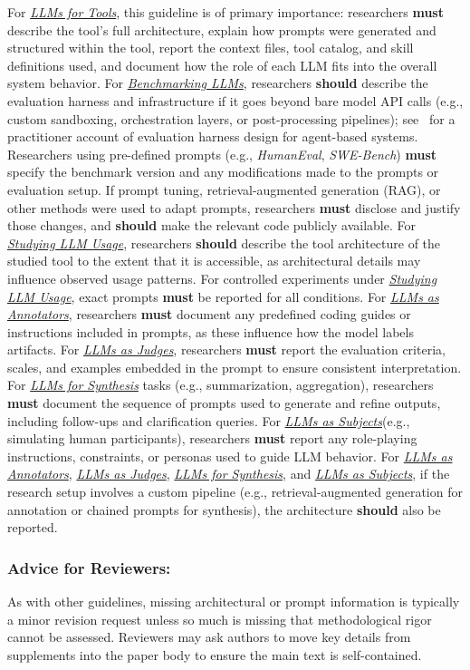 \documentclass[smallextended]{svjour3}
\newcommand{\must}{\textbf{must}\xspace}
\newcommand{\should}{\textbf{should}\xspace}
\newcommand{\annotators}{\hyperref[sec:llms-as-annotators]{\emph{LLMs as Annotators}}\xspace}
\newcommand{\judges}{\hyperref[sec:llms-as-judges]{\emph{LLMs as Judges}}\xspace}
\newcommand{\synthesis}{\hyperref[sec:llms-for-synthesis]{\emph{LLMs for Synthesis}}\xspace}
\newcommand{\subjects}{\hyperref[sec:llms-as-subjects]{\emph{LLMs as Subjects}}\xspace}
\newcommand{\llmusage}{\hyperref[sec:studying-llm-usage-in-software-engineering]{\emph{Studying LLM Usage}}\xspace}
\newcommand{\newtools}{\hyperref[sec:llms-for-new-software-engineering-tools]{\emph{LLMs for Tools}}\xspace}
\newcommand{\benchmarkingtasks}{\hyperref[sec:benchmarking-llms-for-software-engineering-tasks]{\emph{Benchmarking LLMs}}\xspace}
\newcommand{\annotators}{\href{/study-types\#llms-as-annotators}{\emph{LLMs as Annotators}}\xspace}
\newcommand{\judges}{\href{/study-types\#llms-as-judges}{\emph{LLMs as Judges}}\xspace}
\newcommand{\synthesis}{\href{/study-types\#llms-for-synthesis}{\emph{LLMs for Synthesis}}\xspace}
\newcommand{\subjects}{\href{/study-types\#llms-as-subjects}{\emph{LLMs as Subjects}}\xspace}
\newcommand{\llmusage}{\href{/study-types\#studying-llm-usage-in-software-engineering}{\emph{Studying LLM Usage}}\xspace}
\newcommand{\newtools}{\href{/study-types\#llms-for-new-software-engineering-tools}{\emph{LLMs for Tools}}\xspace}
\newcommand{\benchmarkingtasks}{\href{/study-types\#benchmarking-llms-for-software-engineering-tasks}{\emph{Benchmarking LLMs}}\xspace}
\newcommand{\guidelinesubsubsection}[1]{\subsubsection{\bfseries #1:}}
\newcommand{\guidelinesubsubsection}[1]{\subsubsection{#1}}
\begin{document}
For \newtools, this guideline is of primary importance: researchers \must describe the tool's full architecture, explain how prompts were generated and structured within the tool, report the context files, tool catalog, and skill definitions used, and document how the role of each LLM fits into the overall system behavior.
For \benchmarkingtasks, researchers \should describe the evaluation harness and infrastructure if it goes beyond bare model API calls (e.g., custom sandboxing, orchestration layers, or post-processing pipelines); see~\cite{Anthropic2025evals} for a practitioner account of evaluation harness design for agent-based systems.
Researchers using pre-defined prompts (e.g., \emph{HumanEval}, \emph{SWE-Bench}) \must specify the benchmark version and any modifications made to the prompts or evaluation setup.
If prompt tuning, retrieval-augmented generation (RAG), or other methods were used to adapt prompts, researchers \must disclose and justify those changes, and \should make the relevant code publicly available.
For \llmusage, researchers \should describe the tool architecture of the studied tool to the extent that it is accessible, as architectural details may influence observed usage patterns.
For controlled experiments under \llmusage, exact prompts \must be reported for all conditions.
For \annotators, researchers \must document any predefined coding guides or instructions included in prompts, as these influence how the model labels artifacts.
For \judges, researchers \must report the evaluation criteria, scales, and examples embedded in the prompt to ensure consistent interpretation.
For \synthesis tasks (e.g., summarization, aggregation), researchers \must document the sequence of prompts used to generate and refine outputs, including follow-ups and clarification queries.
For \subjects (e.g., simulating human participants), researchers \must report any role-playing instructions, constraints, or personas used to guide LLM behavior.
For \annotators, \judges, \synthesis, and \subjects, if the research setup involves a custom pipeline (e.g., retrieval-augmented generation for annotation or chained prompts for synthesis), the architecture \should also be reported.

\guidelinesubsubsection{Advice for Reviewers}

As with other guidelines, missing architectural or prompt information is typically a minor revision request unless so much is missing that methodological rigor cannot be assessed. Reviewers may ask authors to move key details from supplements into the paper body to ensure the main text is self-contained.
\end{document}
